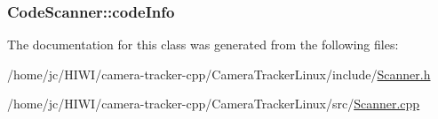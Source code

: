 \subsubsection[{\texorpdfstring{code\+Info}{codeInfo}}]{ Code\+Scanner\+::code\+Info}\hypertarget{class_code_scanner_a7f6371a29a0d630c9508c070f8c8966f}{}\label{class_code_scanner_a7f6371a29a0d630c9508c070f8c8966f}


The documentation for this class was generated from the following files\+:\begin{DoxyCompactItemize}
\item 
/home/jc/\+H\+I\+W\+I/camera-\/tracker-\/cpp/\+Camera\+Tracker\+Linux/include/\hyperlink{_scanner_8h}{Scanner.\+h}\item 
/home/jc/\+H\+I\+W\+I/camera-\/tracker-\/cpp/\+Camera\+Tracker\+Linux/src/\hyperlink{_scanner_8cpp}{Scanner.\+cpp}\end{DoxyCompactItemize}
